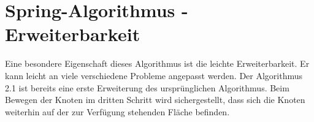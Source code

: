   
\section{Spring-Algorithmus - Erweiterbarkeit}
\label{Kapitel_2_-_Unterkapitel_3}   
Eine besondere Eigenschaft dieses Algorithmus ist die leichte Erweiterbarkeit. Er kann leicht an viele verschiedene Probleme angepasst werden.
Der Algorithmus 2.1 ist bereits eine erste Erweiterung des ursprünglichen Algorithmus. Beim Bewegen der Knoten im dritten Schritt wird sichergestellt, dass sich die Knoten weiterhin auf der zur Verfügung stehenden Fläche befinden.


%
